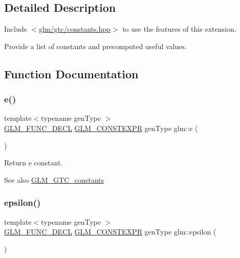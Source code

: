 \subsection{Detailed Description}
Include $<$\mbox{\hyperlink{constants_8hpp}{glm/gtc/constants.\+hpp}}$>$ to use the features of this extension.

Provide a list of constants and precomputed useful values. 

\subsection{Function Documentation}
\mbox{\label{group__gtc__constants_ga4b7956eb6e2fbedfc7cf2e46e85c5139}} 
\subsubsection{\texorpdfstring{e()}{e()}}
{\footnotesize\ttfamily template$<$typename gen\+Type $>$ \\
\mbox{\hyperlink{setup_8hpp_ab2d052de21a70539923e9bcbf6e83a51}{G\+L\+M\+\_\+\+F\+U\+N\+C\+\_\+\+D\+E\+CL}} \mbox{\hyperlink{setup_8hpp_a08b807947b47031d3a511f03f89645ad}{G\+L\+M\+\_\+\+C\+O\+N\+S\+T\+E\+X\+PR}} gen\+Type glm\+::e (\begin{DoxyParamCaption}{ }\end{DoxyParamCaption})}

Return e constant. \begin{DoxySeeAlso}{See also}
\mbox{\hyperlink{group__gtc__constants}{G\+L\+M\+\_\+\+G\+T\+C\+\_\+constants}} 
\end{DoxySeeAlso}
\mbox{\label{group__gtc__constants_ga2a1e57fc5592b69cfae84174cbfc9429}} 
\subsubsection{\texorpdfstring{epsilon()}{epsilon()}}
{\footnotesize\ttfamily template$<$typename gen\+Type $>$ \\
\mbox{\hyperlink{setup_8hpp_ab2d052de21a70539923e9bcbf6e83a51}{G\+L\+M\+\_\+\+F\+U\+N\+C\+\_\+\+D\+E\+CL}} \mbox{\hyperlink{setup_8hpp_a08b807947b47031d3a511f03f89645ad}{G\+L\+M\+\_\+\+C\+O\+N\+S\+T\+E\+X\+PR}} gen\+Type glm\+::epsilon (\begin{DoxyParamCaption}{ }\end{DoxyParamCaption})}

